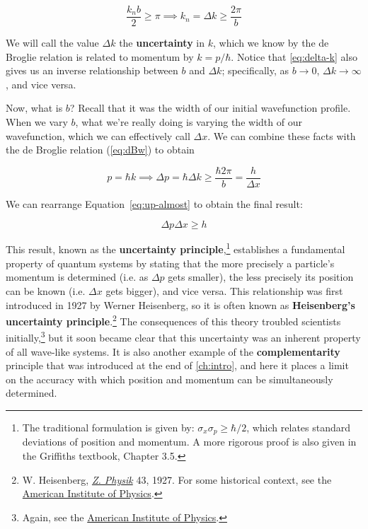 \begin{equation}
	\frac{k_nb}{2} \ge \pi \implies k_n = \Delta k \ge \frac{2\pi}{b} \label{eq:delta-k}
\end{equation}

We will call the value $\Delta k$ the \textbf{uncertainty} in $k$, which we know by the de Broglie relation is related to momentum by $k=p/\hbar$. 
Notice that \autoref{eq:delta-k} also gives us an inverse relationship between $b$ and $\Delta k$; specifically, as $b \rightarrow 0$, $\Delta k \rightarrow \infty$, and vice versa. 

Now, what is $b$? 
Recall that it was the width of our initial wavefunction profile. 
When we vary $b$, what we're really doing is varying the width of our wavefunction, which we can effectively call $\Delta x$. 
We can combine these facts with the de Broglie relation (\autoref{eq:dBw}) to obtain

\begin{equation}
	p = \hbar k \implies \Delta p = \hbar \Delta k \ge  \frac{\hbar 2\pi}{b} = \frac{h}{\Delta x} \label{eq:up-almost}
\end{equation}

We can rearrange Equation~\ref{eq:up-almost} to obtain the final result:

\begin{tcolorbox}[title = Uncertainty principle] \vspace{-2ex}
	\begin{equation}
		\Delta p \Delta x \ge h \label{eq:up}
	\end{equation}
\end{tcolorbox}

This result, known as the \textbf{uncertainty principle},\footnote{The traditional formulation is given by: $\sigma_x\sigma_p \ge \hbar/2$, which relates standard deviations of position and momentum. A more rigorous proof is also given in the Griffiths textbook, Chapter 3.5.} establishes a fundamental property of quantum systems by stating that the more precisely a particle's momentum is determined (i.e. as $\Delta p$ gets smaller), the less precisely its position can be known (i.e. $\Delta x$ gets bigger), and vice versa. 
This relationship was first introduced in 1927 by Werner Heisenberg, so it is often known as \textbf{Heisenberg's uncertainty principle}.\footnote{W. Heisenberg, \href{https://doi.org/10.1007/BF01397280}{\emph{Z. Physik}} 43, 1927. For some historical context, see the \href{https://history.aip.org/exhibits/heisenberg/uncertainty-principle.html}{American Institute of Physics}.} 
The consequences of this theory troubled scientists initially,\footnote{Again, see the \href{http://history.aip.org/exhibits/heisenberg/}{American Institute of Physics}.} but it soon became clear that this uncertainty was an inherent property of all wave-like systems. 
It is also another example of the \textbf{complementarity} principle that was introduced at the end of \autoref{ch:intro}, and here it places a limit on the accuracy with which position and momentum can be simultaneously determined.


